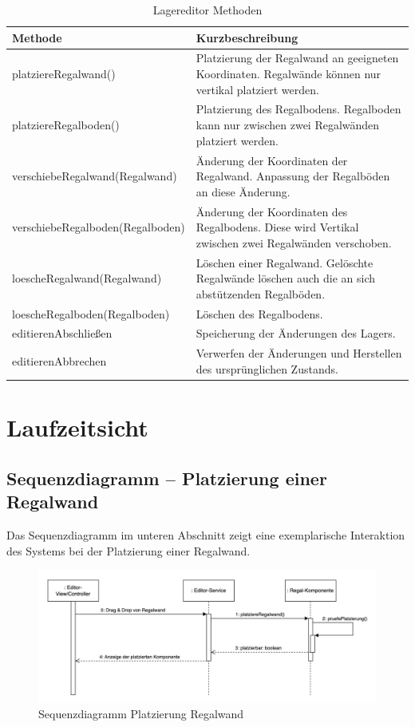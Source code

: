 \begin{table}[h]
    \centering
    \begin{tabularx}{\textwidth}{ l|X }
        \textbf{Methode} & \textbf{Kurzbeschreibung}\\
        \hline
        platziereRegalwand() & Platzierung der Regalwand an geeigneten Koordinaten. Regalwände können nur vertikal
        platziert werden.\\
        \hline
        platziereRegalboden() & Platzierung des Regalbodens. Regalboden kann nur zwischen zwei Regalwänden platziert
        werden.\\
        \hline
        verschiebeRegalwand(Regalwand) & Änderung der Koordinaten der Regalwand. Anpassung der Regalböden an diese
        Änderung.\\
        \hline
        verschiebeRegalboden(Regalboden) & Änderung der Koordinaten des Regalbodens. Diese wird Vertikal zwischen
        zwei Regalwänden verschoben.\\
        \hline
        loescheRegalwand(Regalwand) & Löschen einer Regalwand. Gelöschte Regalwände löschen auch die an sich
        abstützenden Regalböden.\\
        \hline
        loescheRegalboden(Regalboden) & Löschen des Regalbodens.\\
        \hline
        editierenAbschließen & Speicherung der Änderungen des Lagers.\\
        \hline
        editierenAbbrechen & Verwerfen der Änderungen und Herstellen des ursprünglichen Zustands.\\
    \end{tabularx}
    \caption{Lagereditor Methoden}
    \label{tab:Lagereditor_Methoden}
\end{table}

\section{Laufzeitsicht}

\subsection{Sequenzdiagramm – Platzierung einer Regalwand}
Das Sequenzdiagramm im unteren Abschnitt zeigt eine exemplarische Interaktion des Systems bei der Platzierung einer Regalwand.

\begin{figure}[H]
    \centering
    \includegraphics[width=1\textwidth]{Bilder/Kapitel/Laufzeitsicht/Sequenzdiagramm_Platzierung-Regalwand}
    \caption{Sequenzdiagramm Platzierung Regalwand}
    \label{fig:Sequenzdiagramm_Platzierung-Regalwand}
\end{figure}

